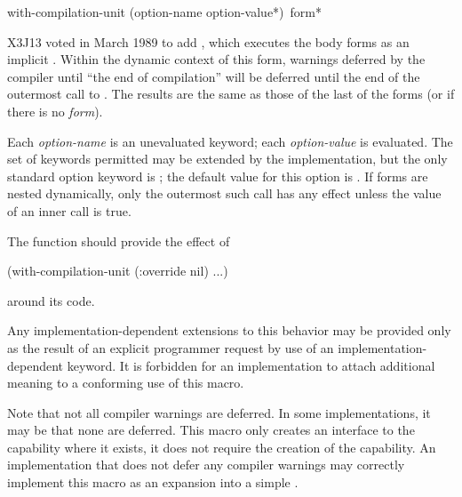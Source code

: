 \begin{newer}
\begin{defmac}
with-compilation-unit ({option-name option-value}*) {\,form}*

X3J13 voted in March 1989 
to add , which
   executes the body forms as an implicit . Within the dynamic context
   of this form, warnings deferred by the compiler until ``the end of
   compilation'' will be deferred until the end of the outermost call
   to . The results are the same as those of
   the last of the forms (or  if there is no {\it form}).

   Each {\it option-name} is an unevaluated keyword; each {\it option-value}
   is evaluated. The set of keywords permitted may be extended by the
   implementation, but the only standard option keyword is ;
   the default value for this option is .
   If  forms are nested dynamically, only the outermost
   such call has any effect unless the  value of an
   inner call is true.

  The function  should
  provide the effect of
  \begin{lisp}
  (with-compilation-unit (:override nil) ...)
  \end{lisp}
  around its code.

  Any implementation-dependent extensions to this behavior may be provided only
  as the result of an explicit programmer request by use of 
  an implementation-dependent keyword.  It is forbidden for an implementation
  to attach additional meaning to a conforming use of this
  macro.

  Note that not all compiler warnings are deferred. In some implementations,
  it may be that none are deferred. This macro only creates an
  interface to the capability where it exists, it does not require the
  creation of the capability. An implementation that does not 
  defer any compiler warnings may correctly implement this macro
  as an expansion into a simple .
\end{defmac}
\end{newer}

